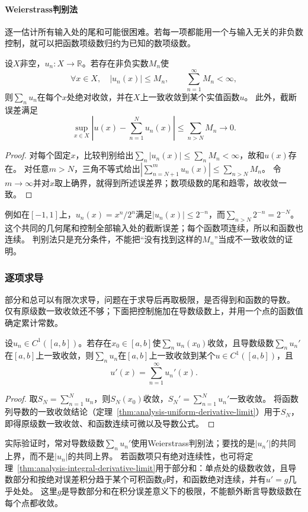 \paragraph{Weierstrass判别法}
逐一估计所有输入处的尾和可能很困难。若每一项都能用一个与输入无关的非负数控制，就可以把函数项级数归约为已知的数项级数。
\begin{theorem}[Weierstrass判别法]
\label{thm:analysis-weierstrass-series-test}
设$X$非空，$u_n:X\to\mathbb R$。若存在非负实数$M_n$使
\[
 \forall x\in X,\quad |u_n(x)|\leq M_n,
 \qquad \sum_{n=1}^{\infty}M_n<\infty,
\]
则$\sum_nu_n$在每个$x$处绝对收敛，并在$X$上一致收敛到某个实值函数$u$。
此外，截断误差满足
\[
 \sup_{x\in X}\left|u(x)-\sum_{n=1}^Nu_n(x)\right|
 \leq\sum_{n>N}M_n\longrightarrow0.
\]
\end{theorem}
\begin{proof}
对每个固定$x$，比较判别给出$\sum_n|u_n(x)|\leq\sum_nM_n<\infty$，故和$u(x)$存在。
对任意$m>N$，三角不等式给出$|\sum_{n=N+1}^m u_n(x)|\leq\sum_{n>N}M_n$。
令$m\to\infty$并对$x$取上确界，就得到所述误差界；数项级数的尾和趋零，故收敛一致。
\end{proof}
例如在$[-1,1]$上，$u_n(x)=x^n/2^n$满足$|u_n(x)|\leq2^{-n}$，而$\sum_{n>N}2^{-n}=2^{-N}$。
这个共同的几何尾和控制全部输入处的截断误差；每个函数项连续，所以和函数也连续。
判别法只是充分条件，不能把“没有找到这样的$M_n$”当成不一致收敛的证明。

\subsubsection{逐项求导}

部分和总可以有限次求导，问题在于求导后再取极限，是否得到和函数的导数。
仅有原级数一致收敛还不够；下面把控制施加在导数级数上，并用一个点的函数值确定累计常数。
\begin{theorem}[函数项级数的逐项求导]
\label{thm:analysis-function-series-differentiation}
设$u_n\in C^1([a,b])$。若存在$x_0\in[a,b]$使$\sum_nu_n(x_0)$收敛，且导数级数$\sum_nu_n'$在$[a,b]$上一致收敛，则$\sum_nu_n$在$[a,b]$上一致收敛到某个$u\in C^1([a,b])$，且
\[
 u'(x)=\sum_{n=1}^{\infty}u_n'(x).
\]
\end{theorem}
\begin{proof}
取$S_N=\sum_{n=1}^Nu_n$，则$S_N(x_0)$收敛，$S_N'=\sum_{n=1}^Nu_n'$一致收敛。
将函数列导数的一致收敛结论（定理~\ref{thm:analysis-uniform-derivative-limit}）用于$S_N$，即得原级数一致收敛、和函数连续可微以及导数公式。
\end{proof}
实际验证时，常对导数级数$\sum_nu_n'$使用Weierstrass判别法；要找的是$|u_n'|$的共同上界，而不是$|u_n|$的共同上界。
若函数项只有绝对连续性，也可将定理~\ref{thm:analysis-integral-derivative-limit}用于部分和：单点处的级数收敛，且导数部分和按绝对误差积分趋于某个可积函数$g$时，和函数绝对连续，并有$u'=g$几乎处处。
这里$g$是导数部分和在积分误差意义下的极限，不能额外断言导数级数在每个点都收敛。

